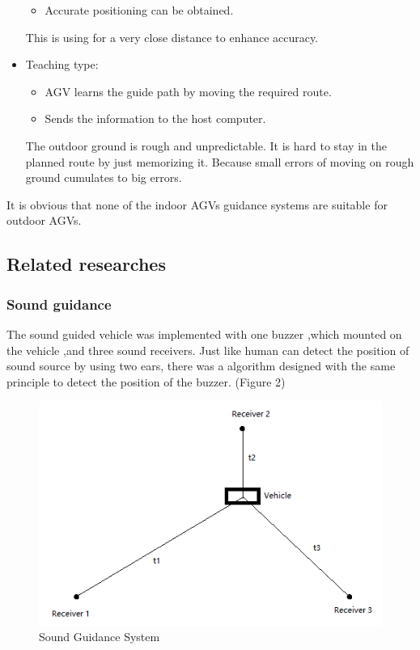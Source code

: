 \documentclass[12pt]{article}
\begin{document}
\begin{flushleft}
\begin{itemize}
\begin{itemize}
		\item Accurate positioning can be obtained.
	\end{itemize}
	This is using for a very close distance to enhance accuracy.
	\item Teaching type:
	\begin{itemize}
		\item AGV learns the guide path by moving the required route.
		\item Sends the information to the host computer.
	\end{itemize}
	The outdoor ground is rough and unpredictable. It is hard to stay in the planned route by just memorizing it. Because small errors of moving on rough ground cumulates to big errors. 
\end{itemize}
It is obvious that none of the indoor AGVs guidance systems are suitable for outdoor AGVs.

\subsection{Related researches}
\subsubsection{Sound guidance}
The sound guided vehicle was implemented with one buzzer ,which mounted on the vehicle ,and three sound receivers. Just like human can detect the position of sound source by using two ears, there was a algorithm designed with the same principle to detect the position of the buzzer. (Figure 2) 
\begin{figure}[ht!]
	\begin{center}
		\includegraphics[scale = 1]{soundguided.png}
		\caption{Sound Guidance System}
	\end{center}
\end{figure}


\end{flushleft}
\end{document}
